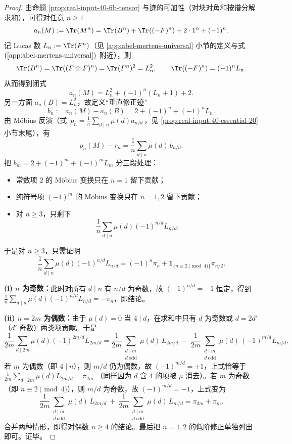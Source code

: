 \begin{proof}
由命题 \ref{prop:real-input-40-fib-tensor} 与迹的可加性（对块对角和按谱分解求和），可得对任意 \(n\ge 1\)
\[
a_n(M):=\Tr(M^n)
=\Tr(B^n)+\Tr((-F)^n)+2\cdot 1^n+(-1)^n.
\]
记 Lucas 数 \(L_n:=\Tr(F^n)\)（见 \ref{app:abel-mertens-universal} 小节的定义与式 \((\ref{app:abel-mertens-universal})\) 附近），则
\[
\Tr(B^n)=\Tr((F\otimes F)^n)=\Tr(F^n)^2=L_n^2,
\qquad
\Tr((-F)^n)=(-1)^n L_n.
\]
从而得到闭式
\[
a_n(M)=L_n^2+(-1)^n(L_n+1)+2.
\]
另一方面 \(a_n(B)=L_n^2\)，故定义“垂直修正迹”
\[
b_n:=a_n(M)-a_n(B)=2+(-1)^n+(-1)^nL_n.
\]
由 Möbius 反演（式 \(\,p_n=\frac1n\sum_{d\mid n}\mu(d)a_{n/d}\,\)，见 \ref{prop:real-input-40-essential-20} 小节末尾），有
\[
p_n(M)-r_n=\frac{1}{n}\sum_{d\mid n}\mu(d)\,b_{n/d}.
\]
把 \(b_m=2+(-1)^m+(-1)^mL_m\) 分三段处理：
\begin{itemize}
  \item 常数项 \(2\) 的 Möbius 变换只在 \(n=1\) 留下贡献；
  \item 纯符号项 \((-1)^m\) 的 Möbius 变换只在 \(n=1,2\) 留下贡献；
  \item 对 \(n\ge 3\)，只剩下
  \[
  \frac{1}{n}\sum_{d\mid n}\mu(d)(-1)^{n/d}L_{n/d}.
  \]
\end{itemize}
于是对 \(n\ge 3\)，只需证明
\[
\frac{1}{n}\sum_{d\mid n}\mu(d)(-1)^{n/d}L_{n/d}
=(-1)^n\pi_n+\mathbf{1}_{\{n\equiv 2\!\!\pmod 4\}}\pi_{n/2}.
\]

\textbf{(i) \(n\) 为奇数：}此时对所有 \(d\mid n\) 有 \(n/d\) 为奇数，故 \((-1)^{n/d}=-1\) 恒定，得到
\(
\frac{1}{n}\sum_{d\mid n}\mu(d)(-1)^{n/d}L_{n/d}=-\pi_n
\)，即结论。

\textbf{(ii) \(n=2m\) 为偶数：}由于 \(\mu(d)=0\) 当 \(4\mid d\)，在求和中只有 \(d\) 为奇数或 \(d=2d'\)（\(d'\) 奇数）两类项贡献。于是
\[
\frac{1}{2m}\sum_{d\mid 2m}\mu(d)(-1)^{2m/d}L_{2m/d}
=\frac{1}{2m}\sum_{\substack{d\mid m\\ d\ \mathrm{odd}}}\mu(d)\,L_{2m/d}
\ -\ \frac{1}{2m}\sum_{\substack{d\mid m\\ d\ \mathrm{odd}}}\mu(d)\,(-1)^{m/d}L_{m/d}.
\]
若 \(m\) 为偶数（即 \(4\mid n\)），则 \(m/d\) 仍为偶数，故 \((-1)^{m/d}=+1\)，上式恰等于
\(
\frac{1}{2m}\sum_{d\mid 2m}\mu(d)L_{2m/d}=\pi_{2m}
\)
（同样因为 \(d\) 含 \(4\) 的项被 \(\mu\) 消去）。若 \(m\) 为奇数（即 \(n\equiv 2\pmod 4\)），则 \(m/d\) 为奇数，故 \((-1)^{m/d}=-1\)，上式变为
\[
\frac{1}{2m}\sum_{\substack{d\mid m\\ d\ \mathrm{odd}}}\mu(d)\,L_{2m/d}
\ +\ \frac{1}{2m}\sum_{\substack{d\mid m\\ d\ \mathrm{odd}}}\mu(d)\,L_{m/d}
=\pi_{2m}+\pi_m.
\]
合并两种情形，即得对偶数 \(n\ge 4\) 的结论。最后把 \(n=1,2\) 的低阶修正单独列出即可。证毕。
\end{proof}

